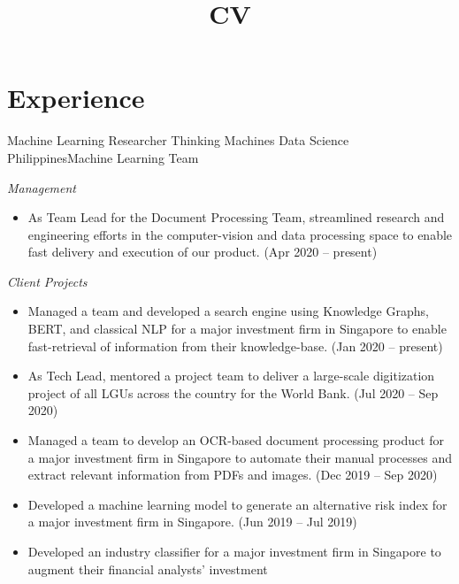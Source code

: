 \documentclass[12pt,a4paper]{moderncv}
\title{CV}
\begin{document}
\maketitle

\section{Experience}
{Machine Learning Researcher}
{Thinking Machines Data Science}
{Philippines}{Machine Learning Team}
{
    \vspace{3px}
    \textit{Management}
    \begin{itemize}
        \item As Team Lead for the Document Processing Team, streamlined
            research and engineering efforts in the computer-vision and data processing
            space to enable fast delivery and execution of our
            {\color{blue}}
            product. (Apr 2020 -- present)
    \end{itemize}
    \vspace{3px}
    \textit{Client Projects}
    \begin{itemize}
        \item Managed a team and developed a search engine using Knowledge
            Graphs, BERT, and classical NLP for a major investment firm in
            Singapore to enable fast-retrieval of information from their
            knowledge-base. (Jan 2020 -- present)
        \item As Tech Lead, mentored a project team to deliver a large-scale
            digitization project of all LGUs across the country for the World Bank.
            (Jul 2020 -- Sep 2020)
        \item Managed a team to develop an OCR-based document processing
            product for a major investment firm in Singapore to automate their
            manual processes and extract relevant information from PDFs and
            images. (Dec 2019 -- Sep 2020)
        \item Developed a machine learning model to generate an alternative
            risk index for a major investment firm in Singapore. (Jun 2019 --
            Jul 2019)
        \item Developed an industry classifier for a major investment firm in
            Singapore to augment their financial analysts' investment

\end{itemize}}
\end{document}
